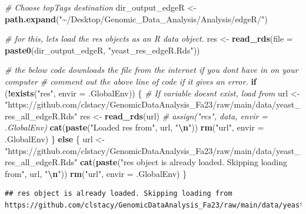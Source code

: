 \documentclass[
]{book}
\newenvironment{Shaded}{\begin{snugshade}}{\end{snugshade}}
\newcommand{\AttributeTok}[1]{\textcolor[rgb]{0.13,0.29,0.53}{#1}}
\newcommand{\CommentTok}[1]{\textcolor[rgb]{0.56,0.35,0.01}{\textit{#1}}}
\newcommand{\ControlFlowTok}[1]{\textcolor[rgb]{0.13,0.29,0.53}{\textbf{#1}}}
\newcommand{\FunctionTok}[1]{\textcolor[rgb]{0.13,0.29,0.53}{\textbf{#1}}}
\newcommand{\NormalTok}[1]{#1}
\newcommand{\OtherTok}[1]{\textcolor[rgb]{0.56,0.35,0.01}{#1}}
\newcommand{\SpecialCharTok}[1]{\textcolor[rgb]{0.81,0.36,0.00}{\textbf{#1}}}
\newcommand{\StringTok}[1]{\textcolor[rgb]{0.31,0.60,0.02}{#1}}
\begin{document}
\begin{Shaded}
\begin{Highlighting}[]
\CommentTok{\# Choose topTags destination}
\NormalTok{dir\_output\_edgeR }\OtherTok{\textless{}{-}}
  \FunctionTok{path.expand}\NormalTok{(}\StringTok{"\textasciitilde{}/Desktop/Genomic\_Data\_Analysis/Analysis/edgeR/"}\NormalTok{)}

\CommentTok{\# for this, let\textquotesingle{}s load the res objects as an R data object.}
\NormalTok{res }\OtherTok{\textless{}{-}} \FunctionTok{read\_rds}\NormalTok{(}\AttributeTok{file =} \FunctionTok{paste0}\NormalTok{(dir\_output\_edgeR, }\StringTok{"yeast\_res\_edgeR.Rds"}\NormalTok{))}

\CommentTok{\# the below code downloads the file from the internet if you don\textquotesingle{}t have in on your computer}
\CommentTok{\# comment out the above line of code if it gives an error.}
\ControlFlowTok{if}\NormalTok{ (}\SpecialCharTok{!}\FunctionTok{exists}\NormalTok{(}\StringTok{"res"}\NormalTok{, }\AttributeTok{envir =}\NormalTok{ .GlobalEnv)) \{}
  \CommentTok{\# If variable doesn\textquotesingle{}t exist, load from}
\NormalTok{  url }\OtherTok{\textless{}{-}} \StringTok{"https://github.com/clstacy/GenomicDataAnalysis\_Fa23/raw/main/data/yeast\_res\_all\_edgeR.Rds"}
\NormalTok{  res }\OtherTok{\textless{}{-}} \FunctionTok{read\_rds}\NormalTok{(url)}
  \CommentTok{\# assign("res", data, envir = .GlobalEnv)}
  \FunctionTok{cat}\NormalTok{(}\FunctionTok{paste}\NormalTok{(}\StringTok{"Loaded res from"}\NormalTok{, url, }\StringTok{"}\SpecialCharTok{\textbackslash{}n}\StringTok{"}\NormalTok{))}
  \FunctionTok{rm}\NormalTok{(}\StringTok{"url"}\NormalTok{, }\AttributeTok{envir =}\NormalTok{ .GlobalEnv)}
\NormalTok{\} }\ControlFlowTok{else}\NormalTok{ \{}
\NormalTok{  url }\OtherTok{\textless{}{-}} \StringTok{"https://github.com/clstacy/GenomicDataAnalysis\_Fa23/raw/main/data/yeast\_res\_all\_edgeR.Rds"}
  \FunctionTok{cat}\NormalTok{(}\FunctionTok{paste}\NormalTok{(}\StringTok{"res object is already loaded. Skipping loading from"}\NormalTok{, url, }\StringTok{"}\SpecialCharTok{\textbackslash{}n}\StringTok{"}\NormalTok{))}
  \FunctionTok{rm}\NormalTok{(}\StringTok{"url"}\NormalTok{, }\AttributeTok{envir =}\NormalTok{ .GlobalEnv)}
\NormalTok{\}}
\end{Highlighting}
\end{Shaded}

\begin{verbatim}
## res object is already loaded. Skipping loading from https://github.com/clstacy/GenomicDataAnalysis_Fa23/raw/main/data/yeast_res_all_edgeR.Rds
\end{verbatim}
\end{document}
